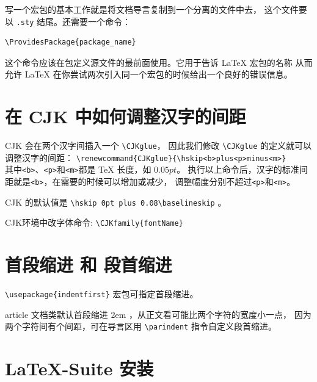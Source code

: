 \documentclass[a4paper,11pt]{article}
\begin{document}
写一个宏包的基本工作就是将文档导言复制到一个分离的文件中去，
这个文件要以 \verb+.sty+ 结尾。还需要一个命令：
\begin{Verbatim}
\ProvidesPackage{package_name}
\end{Verbatim}

这个命令应该在包定义源文件的最前面使用。它用于告诉 \LaTeX{} 宏包的名称%
从而允许 \LaTeX{} 在你尝试两次引入同一个宏包的时候给出一个良好的错误信息。

\section{在 CJK 中如何调整汉字的间距\Mdepr}
CJK 会在两个汉字间插入一个 \verb+\CJKglue+，
因此我们修改 \verb+\CJKglue+ 的定义就可以调整汉字的间距：
\verb+\renewcommand{CJKglue}{\hskip<b>plus<p>minus<m>}+\\
其中\verb+<b>+、\verb+<p>+和\verb+<m>+都是 \TeX{} 长度，如 $0.05pt$。
执行以上命令后，汉字的标准间距就是\verb+<b>+，在需要的时候可以增加或减少，
调整幅度分别不超过\verb+<p>+和\verb+<m>+。

CJK 的默认值是 \verb+\hskip 0pt plus 0.08\baselineskip+ 。

CJK环境中改字体命令: \verb+\CJKfamily{fontName}+

\section{首段缩进 和 段首缩进}
\verb+\usepackage{indentfirst}+ 宏包可指定首段缩进。

article 文档类默认首段缩进 2em ，从正文看可能比两个字符的宽度小一点，
因为两个字符间有个间距，可在导言区用 \verb+\parindent+ 指令自定义段首缩进。

\section{\LaTeX{}-Suite 安装}
\end{document}
